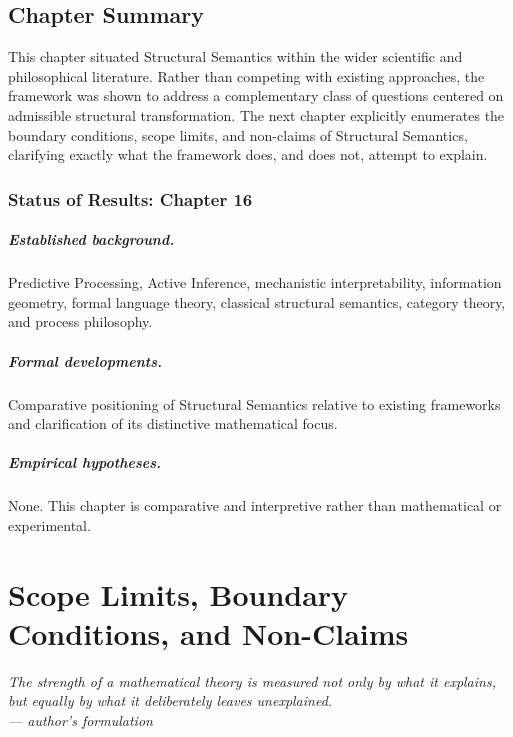 \documentclass[11pt,twoside,openright]{book}
\numberwithin{equation}{chapter}
\theoremstyle{definition}
\theoremstyle{plain}
\theoremstyle{remark}
\theoremstyle{definition}
\begin{document}
\section{Chapter Summary}

This chapter situated Structural Semantics within the wider scientific
and philosophical literature. Rather than competing with existing
approaches, the framework was shown to address a complementary class of
questions centered on admissible structural transformation. The next
chapter explicitly enumerates the boundary conditions, scope limits, and
non-claims of Structural Semantics, clarifying exactly what the framework
does, and does not, attempt to explain.

\subsection*{Status of Results: Chapter 16}

\paragraph{Established background.} Predictive Processing, Active
Inference, mechanistic interpretability, information geometry, formal
language theory, classical structural semantics, category theory, and
process philosophy.

\paragraph{Formal developments.} Comparative positioning of Structural
Semantics relative to existing frameworks and clarification of its
distinctive mathematical focus.

\paragraph{Empirical hypotheses.} None. This chapter is comparative and
interpretive rather than mathematical or experimental.

\chapter{Scope Limits, Boundary Conditions, and Non-Claims}
\label{ch:scope-limits}

\vspace{1em}
\begin{flushright}\itshape
The strength of a mathematical theory is measured not only by what it
explains, but equally by what it deliberately leaves unexplained.\\
\upshape --- author's formulation
\end{flushright}
\vspace{1em}
\end{document}
